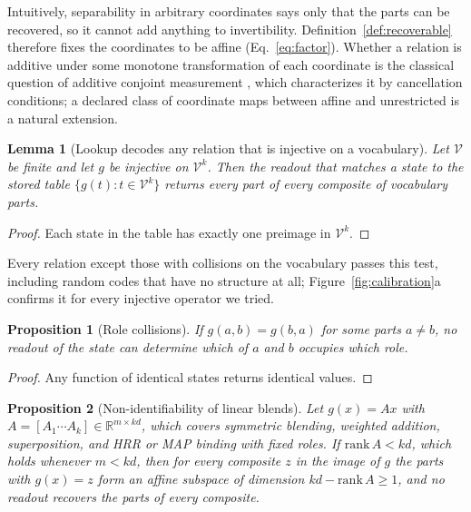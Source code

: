 \documentclass[10pt]{article}
\theoremstyle{plain}
\newtheorem{proposition}{Proposition}
\newtheorem{lemma}{Lemma}
\theoremstyle{remark}
\newcommand{\R}{\mathbb{R}}
\newcommand{\Voc}{\mathcal{V}}
\begin{document}
\noindent
Intuitively, separability in arbitrary coordinates says only that the parts can be recovered, so it cannot add anything to invertibility. Definition~\ref{def:recoverable} therefore fixes the coordinates to be affine (Eq.~\ref{eq:factor}). Whether a relation is additive under some monotone transformation of each coordinate is the classical question of additive conjoint measurement \citep{luce1964}, which characterizes it by cancellation conditions; a declared class of coordinate maps between affine and unrestricted is a natural extension.

\begin{lemma}[Lookup decodes any relation that is injective on a vocabulary]
\label{lem:lookup}
Let $\Voc$ be finite and let $g$ be injective on $\Voc^k$. Then the readout that matches a state to the stored table $\{g(t) : t \in \Voc^k\}$ returns every part of every composite of vocabulary parts.
\end{lemma}

\begin{proof}
Each state in the table has exactly one preimage in $\Voc^k$.
\end{proof}

\noindent
Every relation except those with collisions on the vocabulary passes this test, including random codes that have no structure at all; Figure~\ref{fig:calibration}a confirms it for every injective operator we tried.

\begin{proposition}[Role collisions]
\label{prop:blend}
If $g(a, b) = g(b, a)$ for some parts $a \neq b$, no readout of the state can determine which of $a$ and $b$ occupies which role.
\end{proposition}

\begin{proof}
Any function of identical states returns identical values.
\end{proof}

\begin{proposition}[Non-identifiability of linear blends]
\label{prop:fiber}
Let $g(x) = Ax$ with $A = [A_1 \cdots A_k] \in \R^{m \times kd}$, which covers symmetric blending, weighted addition, superposition, and HRR or MAP binding with fixed roles. If $\mathrm{rank}\,A < kd$, which holds whenever $m < kd$, then for every composite $z$ in the image of $g$ the parts with $g(x) = z$ form an affine subspace of dimension $kd - \mathrm{rank}\,A \geq 1$, and no readout recovers the parts of every composite.
\end{proposition}
\end{document}
